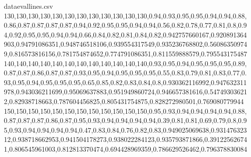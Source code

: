 \documentclass{llncs}
\begin{document}
\begin{filecontents*}{dataevallines.csv}
	130,130,130,130,130,130,130,130,130,130,130,130,0.94,0.93,0.95,0.95,0.94,0.94,0.88,0.86,0.87,0.87,0.87,0.87,0.94,0.92,0.95,0.95,0.94,0.94,0.56,0.82,0.78,0.77,0.81,0.8,0.94,0.92,0.95,0.95,0.94,0.94,0.66,0.84,0.82,0.81,0.84,0.82,0.942757660167,0.920891364903,0.94791086351,0.948746518106,0.939554317549,0.935236768802,0.560863509749,0.816573816156,0.781754874652,0.774791086351,0.811559888579,0.795543175487
	140,140,140,140,140,140,140,140,140,140,140,140,0.93,0.95,0.94,0.95,0.95,0.95,0.89,0.87,0.87,0.86,0.87,0.87,0.93,0.95,0.94,0.95,0.95,0.95,0.55,0.83,0.79,0.81,0.83,0.77,0.93,0.95,0.94,0.95,0.95,0.95,0.65,0.85,0.82,0.83,0.84,0.8,0.930362116992,0.947632311978,0.943036211699,0.95069637883,0.951949860724,0.946657381616,0.547493036212,0.82938718663,0.787604456825,0.805431754875,0.828272980501,0.769080779944
	150,150,150,150,150,150,150,150,150,150,150,150,0.95,0.93,0.94,0.94,0.94,0.94,0.88,0.87,0.87,0.87,0.86,0.87,0.95,0.93,0.94,0.94,0.94,0.94,0.39,0.81,0.81,0.69,0.79,0.8,0.95,0.93,0.94,0.94,0.94,0.94,0.47,0.83,0.84,0.76,0.82,0.83,0.949025069638,0.93147632312,0.938718662953,0.941504178273,0.938022284123,0.935793871866,0.391225626741,0.806545961003,0.812813370474,0.694428969359,0.786629526462,0.796378830084
\end{filecontents*}
\end{document}
